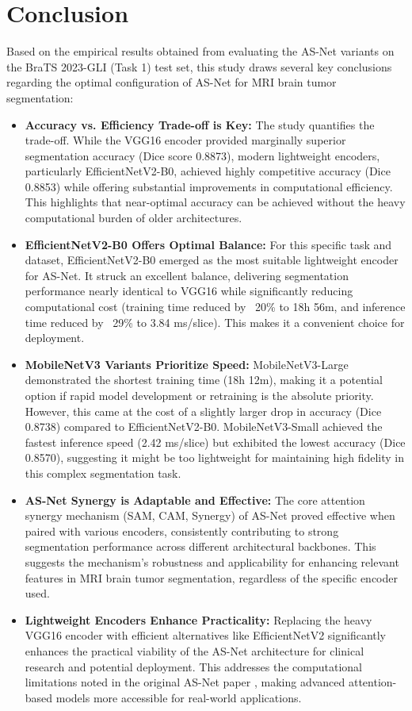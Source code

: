 \section{Conclusion}
Based on the empirical results obtained from evaluating the AS-Net variants on the BraTS 2023-GLI (Task 1) test set, this study draws several key conclusions regarding the optimal configuration of AS-Net for MRI brain tumor segmentation:
\begin{itemize}
  \item \textbf{Accuracy vs. Efficiency Trade-off is Key:} The study quantifies the trade-off. While the VGG16 encoder provided marginally superior segmentation accuracy (Dice score 0.8873), modern lightweight encoders, particularly EfficientNetV2-B0, achieved highly competitive accuracy (Dice 0.8853) while offering substantial improvements in computational efficiency. This highlights that near-optimal accuracy can be achieved without the heavy computational burden of older architectures.
  \item \textbf{EfficientNetV2-B0 Offers Optimal Balance:} For this specific task and dataset, EfficientNetV2-B0 emerged as the most suitable lightweight encoder for AS-Net. It struck an excellent balance, delivering segmentation performance nearly identical to VGG16 while significantly reducing computational cost (training time reduced by ~20\% to 18h 56m, and inference time reduced by ~29\% to 3.84 ms/slice). This makes it a convenient choice for deployment.
  \item \textbf{MobileNetV3 Variants Prioritize Speed:} MobileNetV3-Large demonstrated the shortest training time (18h 12m), making it a potential option if rapid model development or retraining is the absolute priority. However, this came at the cost of a slightly larger drop in accuracy (Dice 0.8738) compared to EfficientNetV2-B0. MobileNetV3-Small achieved the fastest inference speed (2.42 ms/slice) but exhibited the lowest accuracy (Dice 0.8570), suggesting it might be too lightweight for maintaining high fidelity in this complex segmentation task.
  \item \textbf{AS-Net Synergy is Adaptable and Effective:} The core attention synergy mechanism (SAM, CAM, Synergy) of AS-Net proved effective when paired with various encoders, consistently contributing to strong segmentation performance across different architectural backbones. This suggests the mechanism's robustness and applicability for enhancing relevant features in MRI brain tumor segmentation, regardless of the specific encoder used.
  \item \textbf{Lightweight Encoders Enhance Practicality:} Replacing the heavy VGG16 encoder with efficient alternatives like EfficientNetV2 significantly enhances the practical viability of the AS-Net architecture for clinical research and potential deployment. This addresses the computational limitations noted in the original AS-Net paper \parencite{hu2022asnet}, making advanced attention-based models more accessible for real-world applications.
\end{itemize}

